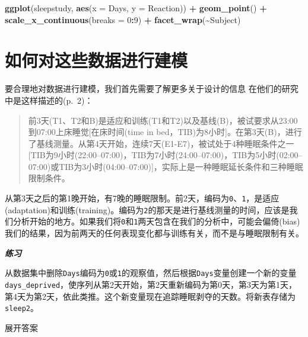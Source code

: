 \documentclass[
]{book}
\newenvironment{Shaded}{\begin{snugshade}}{\end{snugshade}}
\newcommand{\AttributeTok}[1]{\textcolor[rgb]{0.13,0.29,0.53}{#1}}
\newcommand{\DecValTok}[1]{\textcolor[rgb]{0.00,0.00,0.81}{#1}}
\newcommand{\FunctionTok}[1]{\textcolor[rgb]{0.13,0.29,0.53}{\textbf{#1}}}
\newcommand{\NormalTok}[1]{#1}
\newcommand{\SpecialCharTok}[1]{\textcolor[rgb]{0.81,0.36,0.00}{\textbf{#1}}}
\begin{document}
\begin{Shaded}
\begin{Highlighting}[]
\FunctionTok{ggplot}\NormalTok{(sleepstudy, }\FunctionTok{aes}\NormalTok{(}\AttributeTok{x =}\NormalTok{ Days, }\AttributeTok{y =}\NormalTok{ Reaction)) }\SpecialCharTok{+}
  \FunctionTok{geom\_point}\NormalTok{() }\SpecialCharTok{+}
  \FunctionTok{scale\_x\_continuous}\NormalTok{(}\AttributeTok{breaks =} \DecValTok{0}\SpecialCharTok{:}\DecValTok{9}\NormalTok{) }\SpecialCharTok{+}
  \FunctionTok{facet\_wrap}\NormalTok{(}\SpecialCharTok{\textasciitilde{}}\NormalTok{Subject)}
\end{Highlighting}
\end{Shaded}

\hypertarget{ux5982ux4f55ux5bf9ux8fd9ux4e9bux6570ux636eux8fdbux884cux5efaux6a21}{%
\section{如何对这些数据进行建模}\label{ux5982ux4f55ux5bf9ux8fd9ux4e9bux6570ux636eux8fdbux884cux5efaux6a21}}

要合理地对数据进行建模，我们首先需要了解更多关于设计的信息 \citet{Belenky_et_al_2003} 在他们的研究中是这样描述的(p.~2)：

\begin{quote}
前3天(T1、T2和B)是适应和训练(T1和T2)以及基线(B)，被试要求从23:00到07:00上床睡觉{[}在床时间(time in bed，TIB)为8小时{]}。在第3天(B)，进行了基线测量。从第4天开始，连续7天(E1-E7)，被试处于4种睡眠条件之一{[}TIB为9小时(22:00--07:00)，TIB为7小时(24:00--07:00)，TIB为5小时(02:00--07:00)或TIB为3小时(04:00--07:00){]}，实际上是一种睡眠延长条件和三种睡眠限制条件。
\end{quote}

从第3天之后的第1晚开始，有7晚的睡眠限制。前2天，编码为\texttt{0}、\texttt{1}，是适应(adaptation)和训练(training)。编码为\texttt{2}的那天是进行基线测量的时间，应该是我们分析开始的地方。如果我们将\texttt{0}和\texttt{1}两天包含在我们的分析中，可能会偏倚(bias)我们的结果，因为前两天的任何表现变化都与训练有关，而不是与睡眠限制有关。

\textbf{\emph{练习}}

从数据集中删除\texttt{Days}编码为\texttt{0}或\texttt{1}的观察值，然后根据\texttt{Days}变量创建一个新的变量\texttt{days\_deprived}，使序列从第2天开始，第2天重新编码为第0天，第3天为第1天，第4天为第2天，依此类推。这个新变量现在追踪睡眠剥夺的天数。将新表存储为\texttt{sleep2}。

展开答案
\end{document}
